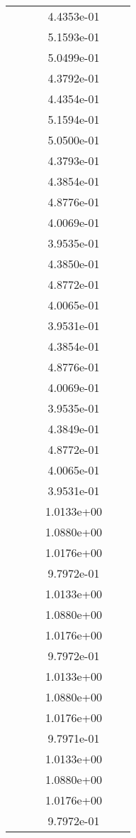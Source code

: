 \begin{xltabular}{\textwidth}{r|rS[table-format=1.3e+2]S[table-format=1.4e+2]S[table-format=1.4e+2]S[table-format=-1.5]}
&  &  & 4.4353e-01 & & \\
&  &  & 5.1593e-01 & & \\
&  &  & 5.0499e-01 & & \\
&  &  & 4.3792e-01 & & \\
&  &  & 4.4354e-01 & & \\
&  &  & 5.1594e-01 & & \\
&  &  & 5.0500e-01 & & \\
&  &  & 4.3793e-01 & & \\
&  &  & 4.3854e-01 & & \\
&  &  & 4.8776e-01 & & \\
&  &  & 4.0069e-01 & & \\
&  &  & 3.9535e-01 & & \\
&  &  & 4.3850e-01 & & \\
&  &  & 4.8772e-01 & & \\
&  &  & 4.0065e-01 & & \\
&  &  & 3.9531e-01 & & \\
&  &  & 4.3854e-01 & & \\
&  &  & 4.8776e-01 & & \\
&  &  & 4.0069e-01 & & \\
&  &  & 3.9535e-01 & & \\
&  &  & 4.3849e-01 & & \\
&  &  & 4.8772e-01 & & \\
&  &  & 4.0065e-01 & & \\
&  &  & 3.9531e-01 & & \\
&  &  & 1.0133e+00 & & \\
&  &  & 1.0880e+00 & & \\
&  &  & 1.0176e+00 & & \\
&  &  & 9.7972e-01 & & \\
&  &  & 1.0133e+00 & & \\
&  &  & 1.0880e+00 & & \\
&  &  & 1.0176e+00 & & \\
&  &  & 9.7972e-01 & & \\
&  &  & 1.0133e+00 & & \\
&  &  & 1.0880e+00 & & \\
&  &  & 1.0176e+00 & & \\
&  &  & 9.7971e-01 & & \\
&  &  & 1.0133e+00 & & \\
&  &  & 1.0880e+00 & & \\
&  &  & 1.0176e+00 & & \\
&  &  & 9.7972e-01 & & \\

\end{xltabular}
